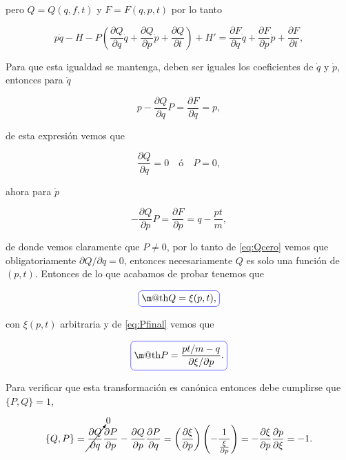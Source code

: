 \documentclass[a4paper,10pt]{article}
\makeatletter
\numberwithin{equation}{section}
\newcommand*{\boxcolor}{blue}
\renewcommand{\boxed}[1]{\textcolor{\boxcolor}{%
\tikz[baseline={([yshift=-1ex]current bounding box.center)}] \node [rectangle, minimum width=1ex,rounded corners,draw] {\normalcolor\m@th$\displaystyle#1$};}}
\makeatother
\begin{document}
pero $Q = Q(q,f,t)$ y  $F = F(q,p,t)$ por lo tanto 

\begin{equation}
 p\dot{q} - H - P\left(\frac{\partial Q}{\partial q}\dot{q} 
 + \frac{\partial Q}{\partial p}\dot{p} + \frac{\partial Q}{\partial t} \right) + 
 H' = \frac{\partial F}{\partial q}\dot{q} 
 + \frac{\partial F}{\partial p}\dot{p} + \frac{\partial F}{\partial t},
\end{equation}

Para que esta igualdad se mantenga, deben ser iguales los coeficientes 
de $\dot{q}$ y $\dot{p}$, entonces para $\dot{q}$

\begin{equation}
 p - \frac{\partial Q}{\partial q}P = \frac{\partial F}{\partial q} = p,
\end{equation}

de esta expresión vemos que 

\begin{equation}
 \frac{\partial Q}{\partial q}= 0\quad \text{ó} \quad P = 0,
 \label{eq:Qcero}
\end{equation}

ahora para $\dot{p}$

\begin{equation}
 - \frac{\partial Q}{\partial p} P = \frac{\partial F}{\partial p} = q - \frac{pt}{m},
\label{eq:Pfinal}
\end{equation}

de donde vemos claramente que $P \ne 0$, por lo tanto de \eqref{eq:Qcero} vemos que 
obligatoriamente $\partial Q / \partial q = 0$, entonces necesariamente $Q$ es solo 
una función de $(p,t)$. Entonces de lo que acabamos de probar tenemos que 

\begin{equation}
  \boxed{Q = \xi(p,t),}
\end{equation}

con $\xi(p,t)$ arbitraria y de \eqref{eq:Pfinal} vemos que 

\begin{equation}
 \boxed{P = \frac{pt/m - q}{\partial \xi/\partial p}.}
\end{equation}

Para verificar que esta transformación es canónica entonces debe cumplirse que 
$\{P,Q\} = 1$, 

\begin{equation}
 \{Q,P\} = \cancelto{0}{\frac{\partial Q}{\partial q}}\frac{\partial P}{\partial p} - 
 \frac{\partial Q}{\partial p}\frac{\partial P}{\partial q} = 
 \left(\frac{\partial \xi}{\partial p}\right)\left(- \frac{1}{\frac{\xi}{\partial p}} \right) = 
 - \frac{\partial \xi}{\partial p}\frac{\partial p}{\partial \xi} = -1.
\end{equation}
\end{document}

